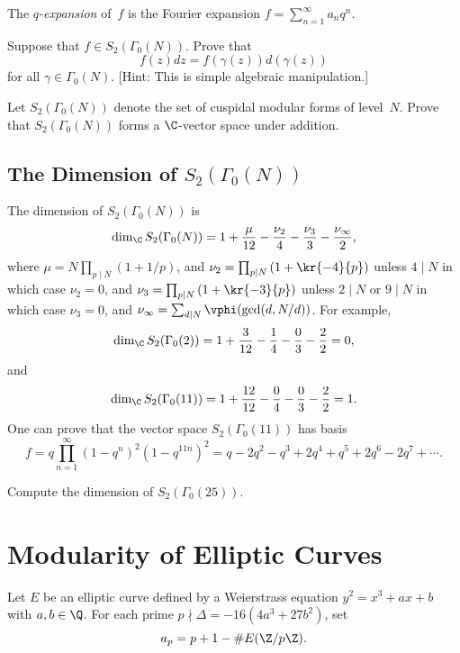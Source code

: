 \documentclass[11pt]{report}
\begin{document}
\begin{definition}
  The {\em $q$-expansion} of~$f$ is the Fourier expansion
  $
    f = \sum_{n=1}^\infty a_n q^n.
  $
\end{definition}

\begin{exercise}
  Suppose that $f\in S_2(\Gamma_0(N))$.  Prove that
  $$
    f(z) dz = f(\gamma(z))d(\gamma(z))
  $$
  for all $\gamma\in\Gamma_0(N)$.  [Hint: This is simple
      algebraic manipulation.]
\end{exercise}

\begin{exercise}
  Let $S_2(\Gamma_0(N))$ denote the set of cuspidal modular forms
  of level~$N$.
  Prove that
  $S_2(\Gamma_0(N))$ forms a $\C$-vector space under addition.
\end{exercise}

\subsection{The Dimension of $S_2(\Gamma_0(N))$}\label{sec:dim}
The dimension of $S_2(\Gamma_0(N))$ is
$$
  \dim_\C S_2(\Gamma_0(N)) =
  1+ \frac{\mu}{12} - \frac{\nu_2}{4} - \frac{\nu_3}{3}
  - \frac{\nu_\infty}{2},
$$
where
$\mu = N \prod_{p\mid N} (1+1/p)$,
and $\nu_2 = \prod_{p\mid N} \left(1+\kr{-4}{p}\right)$ unless $4\mid N$ in which case
$\nu_2=0$, and
$\nu_3 = \prod_{p\mid N} \left(1+\kr{-3}{p}\right)$ unless $2\mid N$ or $9\mid N$
in which case $\nu_3=0$, and
$\nu_\infty = \sum_{d\mid N} \vphi(\gcd(d,N/d))$.
For example,
$$
  \dim_\C S_2(\Gamma_0(2)) =
  1+ \frac{3}{12} - \frac{1}{4} - \frac{0}{3} - \frac{2}{2} = 0,
$$
and
$$
  \dim_\C S_2(\Gamma_0(11)) =
  1+ \frac{12}{12} - \frac{0}{4} - \frac{0}{3} - \frac{2}{2} = 1.
$$
One can prove that the vector space $S_2(\Gamma_0(11))$ has basis
$$
  f = q\prod_{n=1}^{\infty}(1-q^n)^2(1-q^{11n})^2 =
  q - 2q^2 - q^3 + 2q^4 + q^5 + 2q^6 - 2q^7 + \cdots.
$$

\begin{exercise}
  Compute the dimension of $S_2(\Gamma_0(25))$.
\end{exercise}


\section{Modularity of Elliptic Curves}
Let $E$ be an elliptic curve defined
by a Weierstrass equation $y^2 = x^3 + ax + b$
with $a,b\in\Q$.
For each prime $p\nmid \Delta = -16(4a^3 + 27b^2)$,
set
$$
  a_p  = p+1 - \#E(\Z/p\Z).
$$
\end{document}
